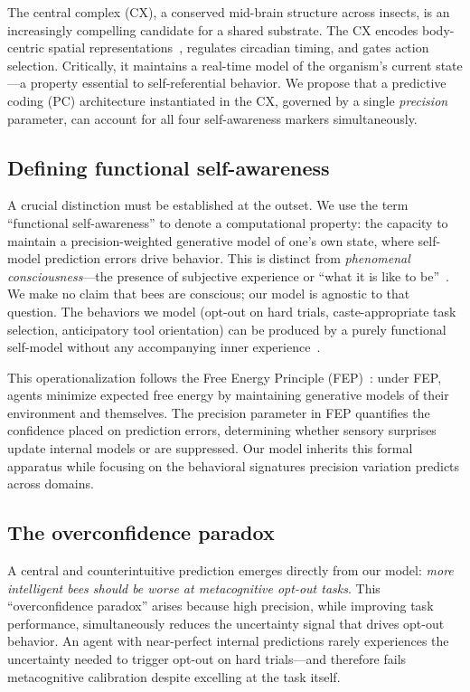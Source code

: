 \documentclass[12pt]{article}
\begin{document}
The central complex (CX), a conserved mid-brain structure across insects, is an increasingly
compelling candidate for a shared substrate. The CX encodes body-centric spatial
representations~\cite{Stone2017CX}, regulates circadian timing, and gates action selection.
Critically, it maintains a real-time model of the organism's current state---a property essential
to self-referential behavior. We propose that a predictive coding (PC) architecture instantiated
in the CX, governed by a single \emph{precision} parameter, can account for all four
self-awareness markers simultaneously.

\subsection*{Defining functional self-awareness}

A crucial distinction must be established at the outset. We use the term ``functional
self-awareness'' to denote a computational property: the capacity to maintain a
precision-weighted generative model of one's own state, where self-model prediction errors drive
behavior. This is distinct from \emph{phenomenal consciousness}---the presence of subjective
experience or ``what it is like to be''~\cite{Metzinger2003}. We make no claim that bees are
conscious; our model is agnostic to that question. The behaviors we model (opt-out on hard trials,
caste-appropriate task selection, anticipatory tool orientation) can be produced by a purely
functional self-model without any accompanying inner experience~\cite{Barron2016}.

This operationalization follows the Free Energy Principle (FEP)~\cite{Friston2010}: under FEP,
agents minimize expected free energy by maintaining generative models of their environment and
themselves. The precision parameter in FEP quantifies the confidence placed on prediction errors,
determining whether sensory surprises update internal models or are suppressed. Our model inherits
this formal apparatus while focusing on the behavioral signatures precision variation predicts
across domains.

\subsection*{The overconfidence paradox}

A central and counterintuitive prediction emerges directly from our model: \emph{more intelligent
bees should be worse at metacognitive opt-out tasks}. This ``overconfidence paradox'' arises
because high precision, while improving task performance, simultaneously reduces the uncertainty
signal that drives opt-out behavior. An agent with near-perfect internal predictions rarely
experiences the uncertainty needed to trigger opt-out on hard trials---and therefore fails
metacognitive calibration despite excelling at the task itself.
\end{document}
